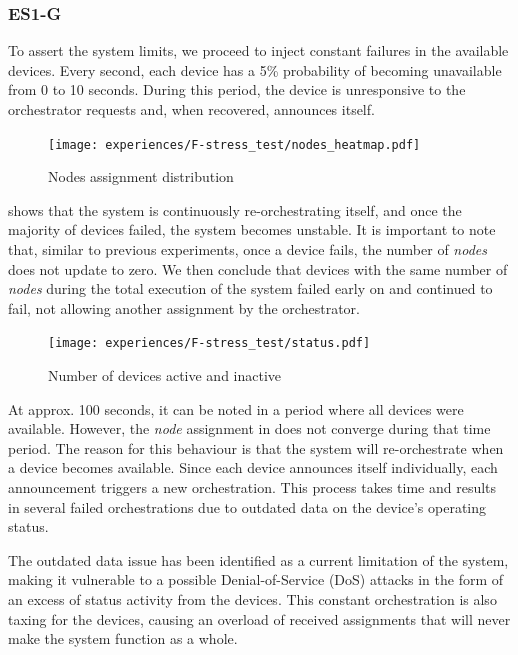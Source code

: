 
\subsubsection{ES1-G}\label{sec:experiment_f}

To assert the system limits, we proceed to inject constant failures in the available devices. Every second, each device has a 5\% probability of becoming unavailable from 0 to 10 seconds. During this period, the device is unresponsive to the orchestrator requests and, when recovered, announces itself.

\begin{figure}[h]
    \centering
    \texttt{[image: experiences/F-stress\_test/nodes\_heatmap.pdf]}
    \caption[Nodes assignment distribution]{Nodes assignment distribution}\label{fig:stress_test_nodes}
\end{figure}

 shows that the system is continuously re-orchestrating itself, and once the majority of devices failed, the system becomes unstable. It is important to note that, similar to previous experiments, once a device fails, the number of \textit{nodes} does not update to zero. We then conclude that devices with the same number of \textit{nodes} during the total execution of the system failed early on and continued to fail, not allowing another assignment by the orchestrator.

\begin{figure}[h]
\centering
\texttt{[image: experiences/F-stress\_test/status.pdf]}
\caption[Number of devices active and inactive]{Number of devices active and inactive}\label{fig:stress_test_status}
\end{figure}

At approx. 100 seconds, it can be noted in  a period where all devices were available. However, the \textit{node} assignment in  does not converge during that time period. The reason for this behaviour is that the system will re-orchestrate when a device becomes available. Since each device announces itself individually, each announcement triggers a new orchestration. This process takes time and results in several failed orchestrations due to outdated data on the device's operating status. 

The outdated data issue has been identified as a current limitation of the system, making it vulnerable to a possible Denial-of-Service (DoS) attacks in the form of an excess of status activity from the devices. This constant orchestration is also taxing for the devices, causing an overload of received assignments that will never make the system function as a whole.

